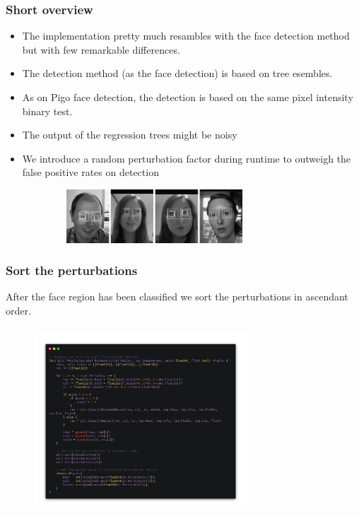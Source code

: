 \documentclass[9pt]{beamer}
\begin{document}
\begin{frame}[fragile]
\frametitle{Short overview}


\begin{itemize}
\item The implementation pretty much resambles with the face detection method but with few remarkable differences.
\end{itemize}

\begin{itemize}
\item The detection method (as the face detection) is based on tree esembles.
\item As on Pigo face detection, the detection is based on the same pixel intensity binary test.
\item The output of the regression trees might be noisy
\item We introduce a random perturbation factor during runtime to outweigh the false positive rates on detection
\end{itemize}

\begin{figure}[h]
\begin{center}
\includegraphics[width=9cm,height=2cm]{assets/puploc_perturbation.jpg}
\end{center}

\end{figure}


\end{frame}

\begin{frame}[fragile]
\frametitle{Sort the perturbations}


After the face region has been classified we sort the perturbations in ascendant order.


\begin{figure}[h]
\begin{center}
\includegraphics[width=8cm,height=7cm]{assets/puploc_detector.png}
\end{center}

\end{figure}


\end{frame}
\end{document}

